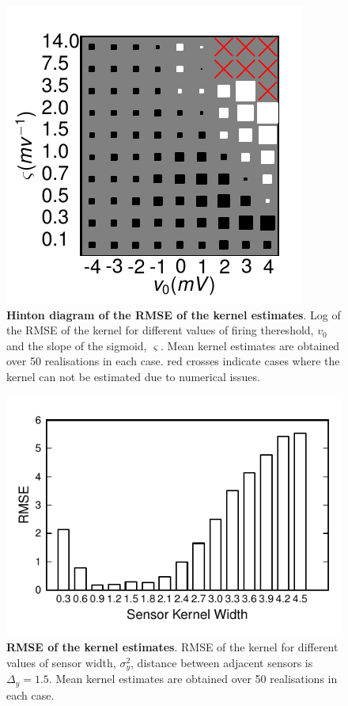\documentclass[12pt]{iopart}
\begin{document}
\begin{figure}[!ht]
\begin{center}
\includegraphics{./Graph/pdf/Figure12.pdf}
\end{center}
\caption{{\bf Hinton diagram of the RMSE of the kernel estimates}. Log of the RMSE of the kernel for different values of firing thereshold, $v_0$ and the slope of the sigmoid, $\varsigma$. Mean kernel estimates are obtained over 50 realisations in each case. red crosses indicate cases where the kernel can not be estimated due to numerical issues.}
\label{fig:Figure12}
\end{figure}
\begin{figure}[!ht]
\begin{center}

\includegraphics{./Graph/pdf/Figure13.pdf}
\end{center}
\caption{{\bf RMSE of the kernel estimates}. RMSE of the kernel for different values of sensor width, $\sigma^2_y$, distance between adjacent sensors is $\Delta_y=1.5$. Mean kernel estimates are obtained over 50 realisations in each case.}
\label{fig:Figure12}
\end{figure}
\end{document}
